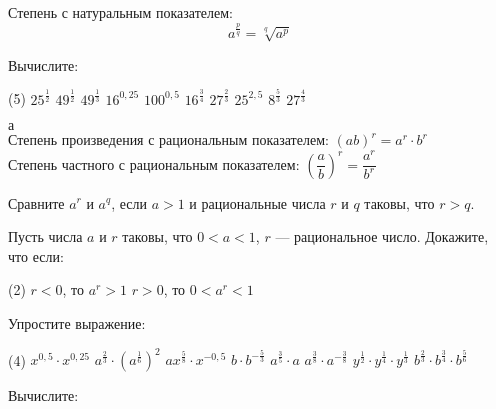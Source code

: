 %
%

\begin{class}[number=1]
	\begin{definit}
		Степень с натуральным показателем: \[ a^{\frac{p}{q}}=\sqrt[q]{a^p} \]
	\end{definit}
	\begin{listofex}
		\item Вычислите: %
		\begin{tasks}(5)
			\task \( 25^{\frac{1}{2}} \)
			\task \( 49^{\frac{1}{2}} \)
			\task \( 49^{\frac{1}{3}} \)
			\task \( 16^{0,25} \)
			\task \( 100^{0,5} \)
			\task \( 16^{\frac{3}{4}} \)
			\task \( 27^{\frac{2}{3}} \)
			\task \( 25^{2,5} \)
			\task \( 8^{\frac{5}{3}} \)
			\task \( 27^{\frac{4}{3}} \)
		\end{tasks}
	\end{listofex}
	\begin{definit}
		\( а \)\\Степень произведения с рациональным показателем: \( (ab)^{r}=a^r \cdot b^r \) \\
		Степень частного с рациональным показателем: \( \left(\dfrac{a}{b}\right)^r=\dfrac{a^r}{b^r} \)
	\end{definit}
	\begin{listofex}
		\item Сравните \( a^r \) и \( a^q \), если \( a>1 \) и рациональные числа \(r\) и \(q\) таковы, что \(r>q\).
		\item Пусть числа \(a\) и \(r\) таковы, что \( 0<a<1 \), \(r\) --- рациональное число. Докажите, что если:
		\begin{tasks}(2)
			\task \( r<0 \), то \( a^r>1 \)
			\task \( r>0 \), то \( 0<a^r<1 \)
		\end{tasks}
		\item Упростите выражение: %
		\begin{tasks}(4)
			\task \( x^{0,5} \cdot x^{0,25} \)
			\task \( a^{\frac{2}{3}} \cdot \left( a^{\frac{1}{6}} \right)^2 \)
			\task \( ax^{\frac{5}{8}} \cdot x^{-0,5} \)
			\task \( b \cdot b^{-\frac{5}{3}} \)
			\task \( a^{\frac{3}{5}} \cdot a \)
			\task \( a^{\frac{3}{8}} \cdot a^{-\frac{3}{8}} \)
			\task \( y^{\frac{1}{2}} \cdot y^{\frac{1}{4}} \cdot y^{\frac{1}{3}} \)
			\task \( b^{\frac{2}{3}} \cdot b^{\frac{3}{4}} \cdot b^{\frac{5}{6}} \)
		\end{tasks}
		\item Вычислите: %

\end{listofex}
\end{class}
